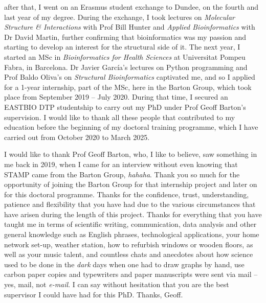 after that, I went on an Erasmus student exchange to Dundee, on the fourth and last year of my degree. During the exchange, I took lectures on \textit{Molecular Structure \& Interactions} with Prof Bill Hunter and \textit{Applied Bioinformatics} with Dr David Martin, further confirming that bioinformatics was my passion and starting to develop an interest for the structural side of it. The next year, I started an MSc in \textit{Bioinformatics for Health Sciences} at Universitat Pompeu Fabra, in Barcelona. Dr Javier García's lectures on Python programming and Prof Baldo Oliva's on \textit{Structural Bioinformatics} captivated me, and so I applied for a 1-year internship, part of the MSc, here in the Barton Group, which took place from September 2019 -- July 2020. During that time, I secured an EASTBIO DTP studentship to carry out my PhD under Prof Geoff Barton's supervision. I would like to thank all these people that contributed to my education before the beginning of my doctoral training programme, which I have carried out from October 2020 to March 2025.

I would like to thank Prof Geoff Barton, who, I like to believe, saw something in me back in 2019, when I came for an interview without even knowing that STAMP came from the Barton Group, \textit{hahaha}. Thank you so much for the opportunity of joining the Barton Group for that internship project and later on for this doctoral programme. Thanks for the confidence, trust, understanding, patience and flexibility that you have had due to the various circumstances that have arisen during the length of this project. Thanks for everything that you have taught me in terms of scientific writing, communication, data analysis and other general knowledge such as English phrases, technological applications, your home network set-up, weather station, how to refurbish windows or wooden floors, as well as your music talent, and countless chats and anecdotes about how science used to be done in the \textit{dark} days when one had to draw graphs by hand, use carbon paper copies and typewriters and paper manuscripts were sent via mail -- yes, mail, not \textit{e-mail}. I can say without hesitation that you are the best supervisor I could have had for this PhD. Thanks, Geoff.

